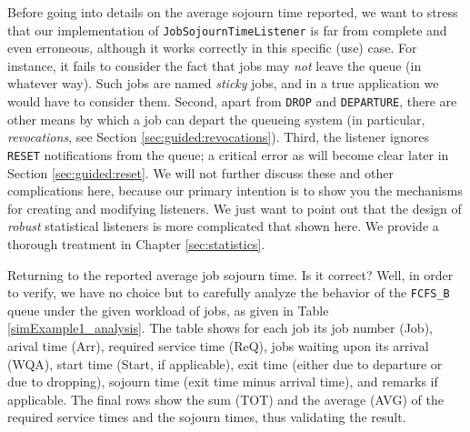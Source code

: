 \documentclass[12pt]{book}
\begin{document}
Before going into details on the average sojourn time reported,
  we want to stress that our implementation of
  \lstinline|JobSojournTimeListener| is far from complete and even erroneous,
  although it works correctly in this specific (use) case.
For instance, it fails to consider the fact that jobs may
  {\em not\/} leave the queue (in whatever way).
Such jobs are named {\em sticky\/} jobs,
  and in a true application we would have to consider them.
Second,
  apart from \lstinline|DROP| and \lstinline|DEPARTURE|,
  there are other means by which a job
  can depart the queueing system
  (in particular, {\em revocations},
   see Section \ref{sec:guided:revocations}).
Third,
  the listener ignores \lstinline|RESET|
  notifications from the queue; a critical error as will become
  clear later in Section \ref{sec:guided:reset}.
We will not further discuss these and other complications here,
  because our primary intention is to show you
  the mechanisms for creating and modifying listeners.
We just want to point out that the design of {\em robust\/}
  statistical listeners is more complicated that shown here.
We provide a thorough treatment in Chapter \ref{sec:statistics}.

Returning to the reported average job sojourn time.
Is it correct?
Well, in order to verify, we have no choice but to carefully analyze
  the behavior of the \lstinline|FCFS_B| queue under the given
  workload of jobs, as given in Table \ref{simExample1_analysis}.
The table shows for each job its
  job number (Job),
  arival time (Arr),
  required service time (ReQ),
  jobs waiting upon its arrival (WQA),
  start time (Start, if applicable),
  exit time (either due to departure or due to dropping),
  sojourn time (exit time minus arrival time),
  and remarks if applicable.
The final rows
  show the sum (TOT) and the average (AVG)
  of the required service times and
  the sojourn times,
  thus validating the result.
\end{document}
